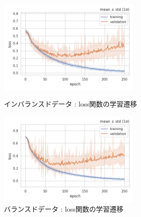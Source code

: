 \documentclass[a4j, 11pt]{jreport}
\begin{document}
\begin{figure}[htbp]
  \begin{minipage}[b]{0.45\hsize}
    \centering
    \includegraphics[keepaspectratio, width=7cm]{images/losses_ex4-2.png}
    \caption{インバランスドデータ : loss関数の学習遷移}
		\label{fig:losses_ex4-2-2}
  \end{minipage}
  \begin{minipage}[b]{0.45\hsize}
    \centering
    \includegraphics[keepaspectratio, width=7cm]{images/losses_ex4-3.png}
    \caption{バランスドデータ : loss関数の学習遷移}
		\label{fig:losses_ex4-3}
  \end{minipage}
\end{figure}
\end{document}

